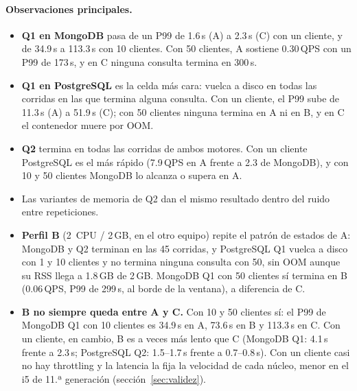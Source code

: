 \documentclass[11pt,letterpaper]{article}
\begin{document}
\paragraph{Observaciones principales.}
\begin{itemize}
  \item \textbf{Q1 en MongoDB} pasa de un P99 de 1.6\,s (A) a 2.3\,s (C) con un cliente, y de
        34.9\,s a 113.3\,s con 10 clientes. Con 50 clientes, A sostiene 0.30\,QPS con un P99 de
        173\,s, y en C ninguna consulta termina en 300\,s.
  \item \textbf{Q1 en PostgreSQL} es la celda más cara: vuelca a disco en todas las corridas en las
        que termina alguna consulta. Con un cliente, el P99 sube de 11.3\,s (A) a 51.9\,s (C); con
        50 clientes ninguna termina en A ni en B, y en C el contenedor muere por OOM.
  \item \textbf{Q2} termina en todas las corridas de ambos motores. Con un cliente PostgreSQL es
        el más rápido (7.9\,QPS en A frente a 2.3 de MongoDB), y con 10 y 50 clientes MongoDB lo
        alcanza o supera en A.
  \item Las variantes de memoria de Q2 dan el mismo resultado dentro del ruido entre repeticiones.
  \item \textbf{Perfil B} (2~CPU / 2\,GB, en el otro equipo) repite el patrón de estados de A:
        MongoDB y Q2 terminan en las 45 corridas, y PostgreSQL Q1 vuelca a disco con 1 y 10
        clientes y no termina ninguna consulta con 50, sin OOM aunque su RSS llega a 1.8\,GB de
        2\,GB. MongoDB Q1 con 50 clientes sí termina en B (0.06\,QPS, P99 de 299\,s, al borde de la
        ventana), a diferencia de C.
  \item \textbf{B no siempre queda entre A y C.} Con 10 y 50 clientes sí: el P99 de MongoDB Q1 con
        10 clientes es 34.9\,s en A, 73.6\,s en B y 113.3\,s en C. Con un cliente, en cambio, B
        es a veces más lento que C (MongoDB Q1: 4.1\,s frente a 2.3\,s; PostgreSQL Q2: 1.5--1.7\,s
        frente a 0.7--0.8\,s). Con un cliente casi no hay throttling y la latencia la fija la
        velocidad de cada núcleo, menor en el i5 de 11.ª generación (sección~\ref{sec:validez}).
\end{itemize}

\begin{table}[H]\centering\small
\caption{Celdas con spill, error u OOM. Spill: mediana de \texttt{temp\_bytes} escritos en la
ventana; \texttt{oom\_kill}: suma de las 3 repeticiones.}
\label{tab:spill}

\end{table}
\end{document}
